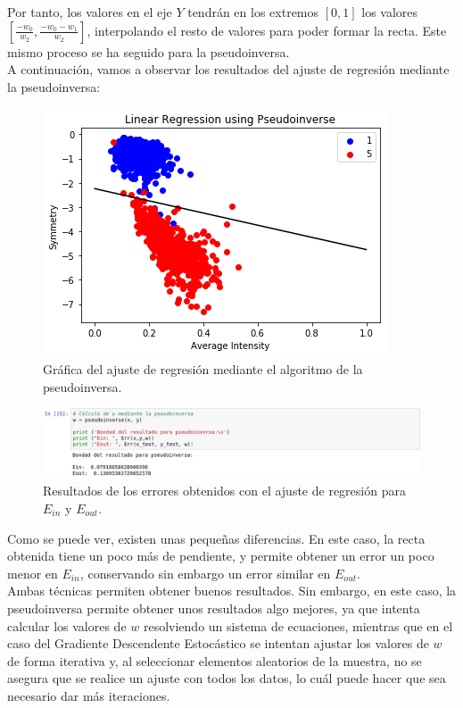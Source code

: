 \documentclass[11pt,a4paper]{article}
\begin{document}
Por tanto, los valores en el eje $Y$ tendrán en los extremos $[0, 1]$ los valores $[\frac{-w_0}{w_2}, \frac{-w_0 - w_1}{w_2}]$,
interpolando el resto de valores para poder formar la recta. Este mismo proceso se ha seguido para la pseudoinversa.\\

A continuación, vamos a observar los resultados del ajuste de regresión mediante la pseudoinversa:

\begin{figure}[H]
\centering
\includegraphics[scale=0.8]{img/pinv_regression.png}
\caption{Gráfica del ajuste de regresión mediante el algoritmo de la pseudoinversa.}
\end{figure}

\begin{figure}[H]
\centering
\includegraphics[scale=0.4]{img/pinv_error.png}
\caption{Resultados de los errores obtenidos con el ajuste de regresión para $E_{in}$ y $E_{out}$.}
\end{figure}

Como se puede ver, existen unas pequeñas diferencias. En este caso, la recta obtenida tiene un poco más de pendiente, y permite
obtener un error un poco menor en $E_{in}$, conservando sin embargo un error similar en $E_{out}$.\\

Ambas técnicas permiten obtener buenos resultados. Sin embargo, en este caso, la pseudoinversa permite obtener unos resultados
algo mejores, ya que intenta calcular los valores de $w$ resolviendo un sistema de ecuaciones, mientras que en el caso del
Gradiente Descendente Estocástico se intentan ajustar los valores de $w$ de forma iterativa y, al seleccionar elementos
aleatorios de la muestra, no se asegura que se realice un ajuste con todos los datos, lo cuál puede hacer que sea necesario
dar más iteraciones.
\end{document}

